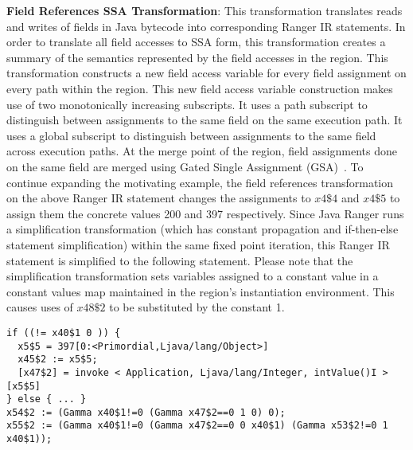 \textbf{Field References SSA Transformation}: This transformation translates reads and writes of fields
in Java bytecode into corresponding Ranger IR statements.
%
In order to translate all field accesses to SSA form, this transformation creates a summary of the semantics
represented by the field accesses in the region.
%
This transformation constructs a new field access variable for every field assignment on every path within the region.
%
This new field access variable construction makes use of two monotonically increasing subscripts.
%
It uses a path subscript to distinguish between assignments to the same field on the same execution path.
%
It uses a global subscript to distinguish between assignments to the same field across execution paths.
%
At the merge point of the region, field assignments done on the same field are merged using
Gated Single Assignment (GSA)~\cite{Ottenstein1990}.
%
To continue expanding the motivating example, the field references transformation on the above Ranger IR statement
changes the assignments to $x4\$4$ and $x4\$5$ to assign them the concrete values 200 and 397 respectively.
%
Since Java Ranger runs a simplification transformation (which has constant propagation and if-then-else statement
simplification) within the same fixed point iteration, this Ranger IR statement is simplified to the following statement.
%
Please note that the simplification transformation sets variables assigned to a constant value in a constant values
map maintained in the region\rq s instantiation environment.
%
This causes uses of $x48\$2$ to be substituted by the constant 1.
%
\begin{lstlisting}
if ((!= x40$1 0 )) {
  x5$5 = 397[0:<Primordial,Ljava/lang/Object>]
  x45$2 := x5$5;
  [x47$2] = invoke < Application, Ljava/lang/Integer, intValue()I >[x5$5]
} else { ... }
x54$2 := (Gamma x40$1!=0 (Gamma x47$2==0 1 0) 0);
x55$2 := (Gamma x40$1!=0 (Gamma x47$2==0 0 x40$1) (Gamma x53$2!=0 1 x40$1));
\end{lstlisting}
